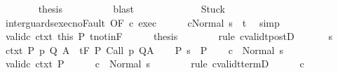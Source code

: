 \begin{isabellebody}
\ \ \ \ \ \ \isamarkupfalse%
\ {\isacharquery}thesis\isanewline
\ \ \ \ \ \ \ \ \isamarkupfalse%
\ blast\isanewline
\ \ \ \ \isamarkupfalse%
\isanewline
\ \ \isamarkupfalse%
\isanewline
\ \ \ \ \isamarkupfalse%
\ Stuck\isanewline
\ \ \ \ \isamarkupfalse%
\ inter{\isacharunderscore}guards{\isacharunderscore}exec{\isacharunderscore}noFault\ {\isacharbrackleft}OF\ c\ exec{\isacharbrackright}\isanewline
\ \ \ \ \isamarkupfalse%
\ {\isachardoublequoteopen}{\isasymGamma}{\isasymturnstile}{\isasymlangle}cNormal\ s{\isasymrangle}\ {\isasymRightarrow}\ t{\isachardoublequoteclose}\ \isamarkupfalse%
\ simp\isanewline
\ \ \ \ \isamarkupfalse%
\ valid{\isacharunderscore}c{}\ ctxt\ this\ P\ t{\isacharunderscore}notin{\isacharunderscore}F\isanewline
\ \ \ \ \isamarkupfalse%
\ {\isacharquery}thesis\isanewline
\ \ \ \ \ \ \isamarkupfalse%
\ {\isacharparenleft}rule\ cvalidt{\isacharunderscore}postD{\isacharparenright}\isanewline
\ \ \isamarkupfalse%
\isanewline
{}\isamarkupfalse%
\isanewline
\ \ \isamarkupfalse%
\ s\isanewline
\ \ \isamarkupfalse%
\ ctxt{\isacharcolon}\ {\isachardoublequoteopen}{\isasymforall}{\isacharparenleft}P{\isacharcomma}\ p{\isacharcomma}\ Q{\isacharcomma}\ A{\isacharparenright}{\isasymin}{\isasymTheta}{\isachardot}\ {\isasymGamma}\ {\isasymTurnstile}\isactrlsub t\isactrlbsub {\isacharslash}F\isactrlesub \ P\ {\isacharparenleft}Call\ p{\isacharparenright}\ Q{\isacharcomma}A{\isachardoublequoteclose}\isanewline
\ \ \isamarkupfalse%
\ P{\isacharcolon}\ {\isachardoublequoteopen}s\ {\isasymin}\ P{\isachardoublequoteclose}\isanewline
\ \ \isamarkupfalse%
\ {\isachardoublequoteopen}{\isasymGamma}{\isasymturnstile}c\ {\isasymdown}\ Normal\ s{\isachardoublequoteclose}\isanewline
\ \ \isamarkupfalse%
\ {\isacharminus}\isanewline
\ \ \ \ \isamarkupfalse%
\ valid{\isacharunderscore}c{}\ ctxt\ P\isanewline
\ \ \ \ \isamarkupfalse%
\ {\isachardoublequoteopen}{\isasymGamma}{\isasymturnstile}c\ {\isasymdown}\ Normal\ s{\isachardoublequoteclose}\isanewline
\ \ \ \ \ \ \isamarkupfalse%
\ {\isacharparenleft}rule\ cvalidt{\isacharunderscore}termD{\isacharparenright}\isanewline
\ \ \ \ \isamarkupfalse%
\ c\ \isamarkupfalse%

\end{isabellebody}
